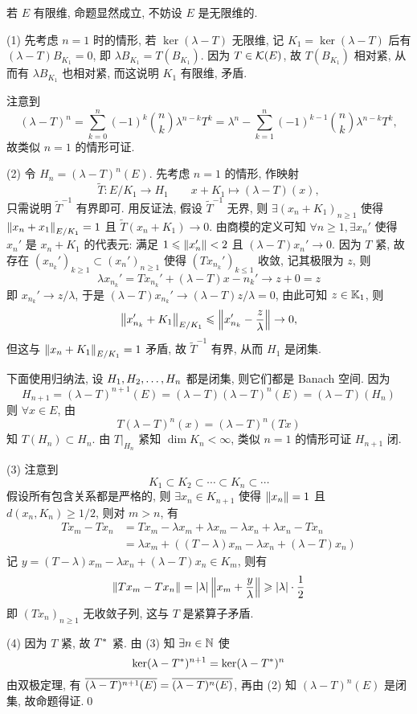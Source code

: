 \begin{Proof}
	若 $ E $ 有限维, 命题显然成立, 不妨设 $ E $ 是无限维的.

	(1) 先考虑 $ n=1 $ 时的情形, 若 $ \ker(\lambda-T) $ 无限维, 记 $ K_{1}=\ker(\lambda-T) $ 后有 $ (\lambda-T)B_{K_{1}}=0 $, 即 $ \lambda B_{K_{1}}=T(B_{K_{1}}) $. 因为 $ T\in\CK(E) $, 故 $ T(B_{K_{1}}) $ 相对紧, 从而有 $ \lambda B_{K_{1}} $ 也相对紧, 而这说明 $ K_{1} $ 有限维, 矛盾.

	注意到
	\[
		(\lambda-T)^{n}=\sum_{k=0}^{n}(-1)^{k}\binom{n}{k}\lambda^{n-k}T^{k} = \lambda^{n}-\sum_{k=1}^{n}(-1)^{k-1}\binom{n}{k}\lambda^{n-k}T^{k},
	\]
	故类似 $ n=1 $ 的情形可证.

	(2) 令 $ H_{n}= (\lambda-T)^{n}(E) $. 先考虑 $ n=1 $ 的情形, 作映射
	\[
		\tilde{T}: E/K_{1}\to H_{1}\qquad x+K_{1}\mapsto (\lambda-T)(x),
	\]
	只需说明 $ \tilde{T}^{-1} $ 有界即可. 用反证法, 假设 $ \tilde{T}^{-1} $ 无界, 则 $ \exists (x_{n}+K_{1})_{n\geqslant1} $ 使得 $ \norm{x_{n}+x_{1}}_{E/K_{1}}=1 $ 且 $ \tilde{T}(x_{n}+K_{1})\to 0 $. 由商模的定义可知 $ \forall n\geqslant1, \exists x_{n}' $ 使得  $ x_{n}' $ 是 $ x_{n}+K_{1} $ 的代表元: 满足 $ 1\leqslant\norm{x_{n}'}<2 $ 且 $ (\lambda-T)x_{n}'\to 0 $. 因为 $ T $ 紧, 故存在 $ (x_{n_{k}}')_{k\geqslant1}\subset(x_{n}')_{n\geqslant1} $ 使得 $ (Tx_{n_{k}}')_{k\leqslant1} $ 收敛, 记其极限为 $ z $, 则
	\[
		\lambda x_{n_{k}}'=Tx_{n_{k}}'+(\lambda-T)x-{n_{k}}'\to z+0=z
	\]
	即 $ x_{n_{k}}'\to z/\lambda $, 于是 $ (\lambda-T)x_{n_{k}}'\to (\lambda-T)z/\lambda=0 $, 由此可知 $ z\in\K_{1} $, 则
	\[
		\norm{x_{n_{k}}'+K_{1}}_{E/K_{1}}\leqslant\norm{x_{n_{k}}'-\frac{z}{\lambda}}\to 0,
	\]
	但这与 $ \norm{x_{n}+K_{1}}_{E/K_{1}}=1 $ 矛盾, 故 $ \tilde{T}^{-1} $ 有界, 从而 $ H_{1} $ 是闭集.

	下面使用归纳法, 设 $ \seq{H} $ 都是闭集, 则它们都是 Banach 空间. 因为
	\[
		H_{n+1}=(\lambda-T)^{n+1}(E)=(\lambda-T)(\lambda-T)^{n}(E)=(\lambda-T)(H_{n})
	\]
	则 $ \forall x\in E $, 由
	\[
		T(\lambda-T)^{n}(x)=(\lambda-T)^{n}(Tx)
	\]
	知 $ T(H_{n})\subset H_{n} $. 由 $ T|_{H_{n}} $ 紧知 $ \dim K_{n}<\infty $, 类似 $ n=1 $ 的情形可证 $ H_{n+1} $ 闭.

	(3) 注意到
	\[
		K_{1}\subset K_{2}\subset\cdots\subset K_{n}\subset\cdots
	\]
	假设所有包含关系都是严格的, 则 $ \exists x_{n}\in K_{n+1} $ 使得 $ \norm{x_{n}}=1 $ 且 $ d(x_{n}, K_{n})\geqslant1/2 $, 则对 $ m>n $, 有
	\[
		\begin{aligned}
			Tx_{m}-Tx_{n} & = Tx_{m}-\lambda x_{m}+\lambda x_{m}-\lambda x_{n}+\lambda x_{n}-Tx_{n} \\
			              & = \lambda x_{m}+((T-\lambda)x_{m}-\lambda x_{n}+(\lambda-T)x_{n})
		\end{aligned}
	\]
	记 $ y=(T-\lambda)x_{m}-\lambda x_{n}+(\lambda-T)x_{n}\in K_{m} $, 则有
	\[
		\norm{Tx_{{m}}-Tx_{n}}=\abs{\lambda}\norm{x_{m}+\frac{y}{\lambda}}\geqslant\abs{\lambda}\cdot\frac{1}{2}
	\]
	即 $ (Tx_{n})_{n\geqslant1} $ 无收敛子列, 这与 $ T $ 是紧算子矛盾.

	(4) 因为 $ T $ 紧, 故 $ \Star{T} $ 紧. 由 (3) 知 $ \exists n\in\N $ 使
	\[
		\ker(\lambda-\Star{T})^{n+1}=\ker(\lambda-\Star{T})^{n}
	\]
	由双极定理, 有 $ \baro{(\lambda-T)^{n+1}(E)}=\baro{(\lambda-T)^{n}(E)} $, 再由 (2) 知 $ (\lambda-T)^{n}(E) $ 是闭集, 故命题得证.\qed
\end{Proof}

